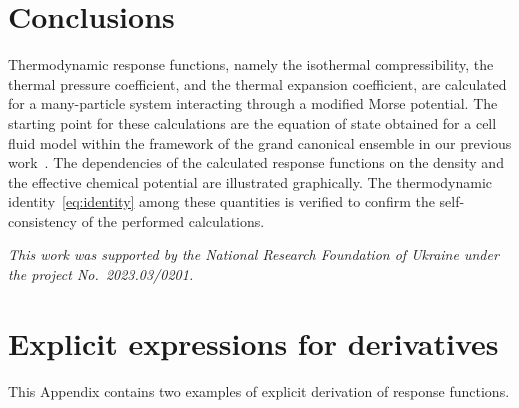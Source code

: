 
\section{Conclusions}
Thermodynamic response functions, namely the isothermal compressibility, the thermal pressure coefficient, and the thermal expansion coefficient, are calculated for a many-particle system interacting through a modified Morse potential. The starting point for these calculations are the equation of state obtained for a cell fluid model within the framework of the grand canonical ensemble in our previous work~\cite{KozlovskiiDobush2020}. The dependencies of the calculated response functions on the density and the effective chemical potential are illustrated graphically. The thermodynamic identity~\eqref{eq:identity} among these quantities is verified to confirm the self-consistency of the performed calculations.

\vskip3mm \textit{This work was supported by the National Research Foundation of Ukraine under the project No.~2023.03/0201.}

\appendix
\renewcommand{\theequation}{A.\arabic{equation}}
\setcounter{equation}{0}

\section{\label{sec:app-a} Explicit expressions for derivatives}
This Appendix contains two examples of explicit derivation of response functions. 

